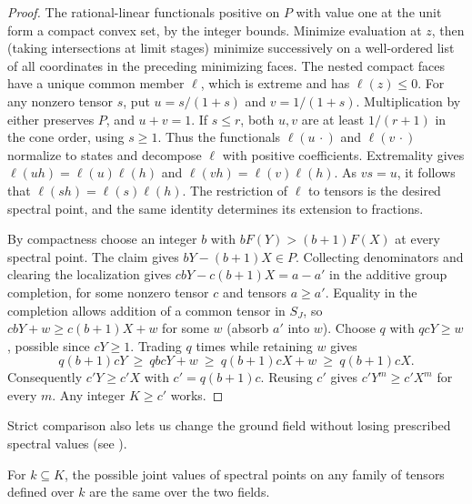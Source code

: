 \begin{proof}
The rational-linear functionals positive on $P$ with value one at the
unit form a compact convex set, by the integer bounds. Minimize
evaluation at $z$, then (taking intersections at limit stages) minimize successively on a well-ordered list of
all coordinates in the preceding minimizing faces. The nested compact
faces have a unique common member $\ell$, which is extreme and has
$\ell(z)\le0$. For any nonzero tensor $s$, put $u=s/(1+s)$ and
$v=1/(1+s)$. Multiplication by either preserves $P$, and $u+v=1$.
If $s\le r$, both $u,v$ are at least $1/(r+1)$ in the cone order,
using $s\ge1$. Thus the functionals $\ell(u\,\cdot)$ and
$\ell(v\,\cdot)$ normalize to states and decompose $\ell$ with
positive coefficients. Extremality gives
$\ell(uh)=\ell(u)\ell(h)$ and $\ell(vh)=\ell(v)\ell(h)$.
As $vs=u$, it follows that $\ell(sh)=\ell(s)\ell(h)$.
The restriction of $\ell$ to tensors is the desired spectral point,
and the same identity determines its extension to fractions.

By compactness choose an integer $b$ with
$b F(Y)>(b+1)F(X)$ at every spectral point. The claim gives
$bY-(b+1)X\in P$. Collecting denominators and clearing the
localization gives $cbY-c(b+1)X=a-a'$ in the additive group
completion, for some nonzero tensor $c$ and tensors $a\ge a'$.
Equality in the completion allows addition of a common tensor in
$S_J$, so $cbY+w\ge c(b+1)X+w$ for some $w$ (absorb $a'$ into
$w$). Choose $q$ with $qcY\ge w$, possible since $cY\ge1$.
Trading $q$ times while retaining $w$ gives
\[
 q(b+1)cY\ \ge\ qbcY+w\ \ge\ q(b+1)cX+w\ \ge\ q(b+1)cX .
\]
Consequently $c'Y\ge c'X$ with $c'=q(b+1)c$. Reusing $c'$ gives
$c'Y^m\ge c'X^m$ for every $m$. Any integer $K\ge c'$ works.
\end{proof}


Strict comparison also lets us change the ground field without losing
prescribed spectral values (see \cite{Strassen1988,CVZ}).
\begin{lemma}\label{lem:comparison}
For $k\subseteq K$, the possible joint values of spectral points on
any family of tensors defined over $k$ are the same over the two fields.
\end{lemma}

